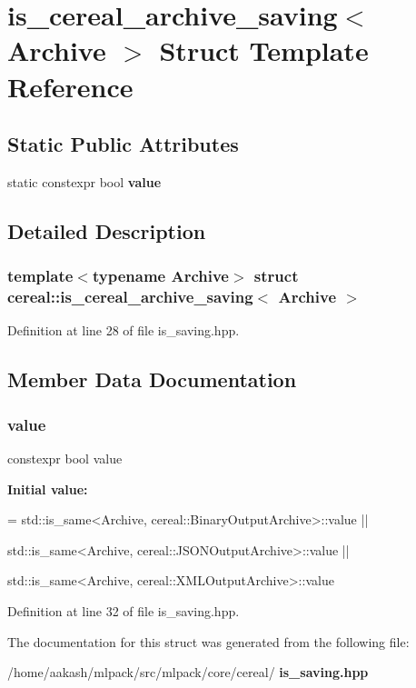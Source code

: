 \section{is\+\_\+cereal\+\_\+archive\+\_\+saving$<$ Archive $>$ Struct Template Reference}
\label{structcereal_1_1is__cereal__archive__saving}
\subsection*{Static Public Attributes}
\begin{DoxyCompactItemize}
\item 
static constexpr bool \textbf{ value}
\end{DoxyCompactItemize}


\subsection{Detailed Description}
\subsubsection*{template$<$typename Archive$>$\newline
struct cereal\+::is\+\_\+cereal\+\_\+archive\+\_\+saving$<$ Archive $>$}



Definition at line 28 of file is\+\_\+saving.\+hpp.



\subsection{Member Data Documentation}
\mbox{\label{structcereal_1_1is__cereal__archive__saving_a5b4ee4ae6cba6bb75200ba7af1910873}} 
\subsubsection{value}
{\footnotesize\ttfamily constexpr bool value\hspace{0.3cm}{\ttfamily [static]}}

{\bfseries Initial value\+:}
\begin{DoxyCode}
= std::is\_same<Archive,
      cereal::BinaryOutputArchive>::value ||

      std::is\_same<Archive, cereal::JSONOutputArchive>::value ||

      std::is\_same<Archive, cereal::XMLOutputArchive>::value
\end{DoxyCode}


Definition at line 32 of file is\+\_\+saving.\+hpp.



The documentation for this struct was generated from the following file\+:\begin{DoxyCompactItemize}
\item 
/home/aakash/mlpack/src/mlpack/core/cereal/\textbf{ is\+\_\+saving.\+hpp}\end{DoxyCompactItemize}
